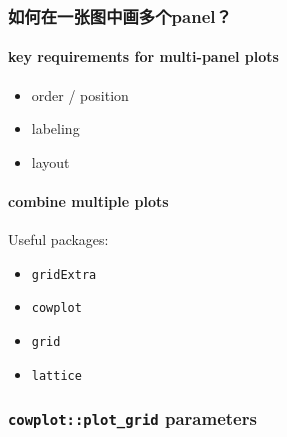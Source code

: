 \documentclass[
]{article}
\begin{document}
\hypertarget{ux5982ux4f55ux5728ux4e00ux5f20ux56feux4e2dux753bux591aux4e2apanel}{%
\subsubsection{如何在一张图中画多个panel？}\label{ux5982ux4f55ux5728ux4e00ux5f20ux56feux4e2dux753bux591aux4e2apanel}}

\hypertarget{key-requirements-for-multi-panel-plots}{%
\paragraph{key requirements for multi-panel
plots}\label{key-requirements-for-multi-panel-plots}}

\begin{itemize}
\item
  order / position
\item
  labeling
\item
  layout
\end{itemize}

\hypertarget{combine-multiple-plots}{%
\paragraph{combine multiple plots}\label{combine-multiple-plots}}

Useful packages:

\begin{itemize}
\item
  \texttt{gridExtra}
\item
  \texttt{cowplot}
\item
  \texttt{grid}
\item
  \texttt{lattice}
\end{itemize}

\hypertarget{cowplotplotgrid-parameters}{%
\subsubsection{\texorpdfstring{\texttt{cowplot::plot\_grid}
parameters}{cowplot::plot\_grid parameters}}\label{cowplotplotgrid-parameters}}
\end{document}
